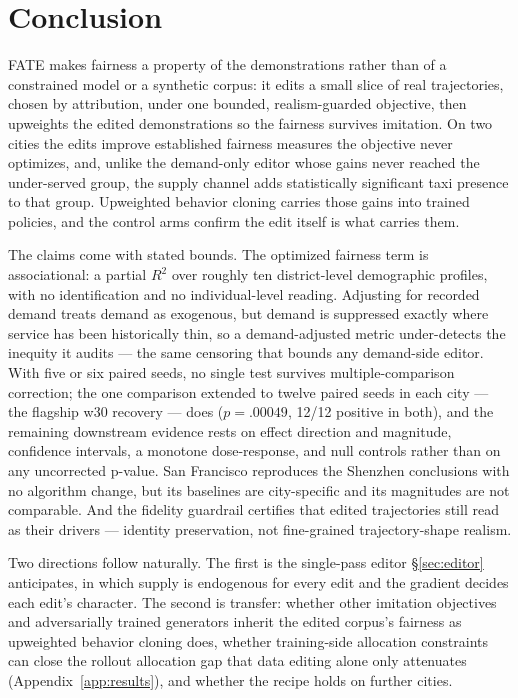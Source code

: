 \section{Conclusion}\label{sec:conclusion}

FATE makes fairness a property of the demonstrations rather than of a
constrained model or a synthetic corpus: it edits a small slice of real
trajectories, chosen by attribution, under one bounded, realism-guarded
objective, then upweights the edited demonstrations so the fairness
survives imitation. On two cities
the edits improve established fairness measures the objective never
optimizes, and, unlike the demand-only editor whose gains never reached the
under-served group, the supply channel adds statistically significant taxi
presence to that group. Upweighted behavior cloning carries those gains into
trained policies, and the control arms confirm the edit itself is what carries them.

The claims come with stated bounds. The optimized fairness term is
associational: a partial $R^2$ over roughly ten district-level demographic
profiles, with no identification and no individual-level reading.
Adjusting for recorded demand treats demand as exogenous, but demand is
suppressed exactly where service has been historically thin, so a
demand-adjusted metric under-detects the inequity it audits --- the same
censoring that bounds any demand-side editor. With five or six paired
seeds, no single test survives multiple-comparison correction; the one
comparison extended to twelve paired seeds in each city --- the flagship
w30 recovery --- does ($p = .00049$, 12/12 positive in both), and the
remaining downstream evidence rests on effect direction and magnitude,
confidence intervals, a monotone dose-response, and null controls rather
than on any uncorrected p-value. San Francisco reproduces the Shenzhen
conclusions with no algorithm change, but its baselines are city-specific and
its magnitudes are not comparable. And the fidelity guardrail certifies that
edited trajectories still read as their drivers --- identity preservation,
not fine-grained trajectory-shape realism.

Two directions follow naturally. The first is the single-pass editor
\S\ref{sec:editor} anticipates, in which supply is endogenous for every edit
and the gradient decides each edit's character. The second is transfer:
whether other imitation objectives and adversarially trained generators
inherit the edited corpus's fairness as upweighted behavior cloning does,
whether training-side allocation constraints can close the rollout
allocation gap that data editing alone only attenuates
(Appendix~\ref{app:results}), and whether the recipe holds on further
cities.
